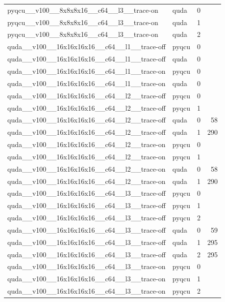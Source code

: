 \begin{table}[htbp]
\begin{tabular}{@{}llrr@{}}
pyqcu\_\_v100\_\_8x8x8x16\_\_c64\_\_l3\_\_trace-on & quda & 0 &  \\
pyqcu\_\_v100\_\_8x8x8x16\_\_c64\_\_l3\_\_trace-on & quda & 1 &  \\
pyqcu\_\_v100\_\_8x8x8x16\_\_c64\_\_l3\_\_trace-on & quda & 2 &  \\
quda\_\_v100\_\_16x16x16x16\_\_c64\_\_l1\_\_trace-off & pyqcu & 0 &  \\
quda\_\_v100\_\_16x16x16x16\_\_c64\_\_l1\_\_trace-off & quda & 0 &  \\
quda\_\_v100\_\_16x16x16x16\_\_c64\_\_l1\_\_trace-on & pyqcu & 0 &  \\
quda\_\_v100\_\_16x16x16x16\_\_c64\_\_l1\_\_trace-on & quda & 0 &  \\
quda\_\_v100\_\_16x16x16x16\_\_c64\_\_l2\_\_trace-off & pyqcu & 0 &  \\
quda\_\_v100\_\_16x16x16x16\_\_c64\_\_l2\_\_trace-off & pyqcu & 1 &  \\
quda\_\_v100\_\_16x16x16x16\_\_c64\_\_l2\_\_trace-off & quda & 0 & 58 \\
quda\_\_v100\_\_16x16x16x16\_\_c64\_\_l2\_\_trace-off & quda & 1 & 290 \\
quda\_\_v100\_\_16x16x16x16\_\_c64\_\_l2\_\_trace-on & pyqcu & 0 &  \\
quda\_\_v100\_\_16x16x16x16\_\_c64\_\_l2\_\_trace-on & pyqcu & 1 &  \\
quda\_\_v100\_\_16x16x16x16\_\_c64\_\_l2\_\_trace-on & quda & 0 & 58 \\
quda\_\_v100\_\_16x16x16x16\_\_c64\_\_l2\_\_trace-on & quda & 1 & 290 \\
quda\_\_v100\_\_16x16x16x16\_\_c64\_\_l3\_\_trace-off & pyqcu & 0 &  \\
quda\_\_v100\_\_16x16x16x16\_\_c64\_\_l3\_\_trace-off & pyqcu & 1 &  \\
quda\_\_v100\_\_16x16x16x16\_\_c64\_\_l3\_\_trace-off & pyqcu & 2 &  \\
quda\_\_v100\_\_16x16x16x16\_\_c64\_\_l3\_\_trace-off & quda & 0 & 59 \\
quda\_\_v100\_\_16x16x16x16\_\_c64\_\_l3\_\_trace-off & quda & 1 & 295 \\
quda\_\_v100\_\_16x16x16x16\_\_c64\_\_l3\_\_trace-off & quda & 2 & 295 \\
quda\_\_v100\_\_16x16x16x16\_\_c64\_\_l3\_\_trace-on & pyqcu & 0 &  \\
quda\_\_v100\_\_16x16x16x16\_\_c64\_\_l3\_\_trace-on & pyqcu & 1 &  \\
quda\_\_v100\_\_16x16x16x16\_\_c64\_\_l3\_\_trace-on & pyqcu & 2 &  \\

\end{tabular}
\end{table}
